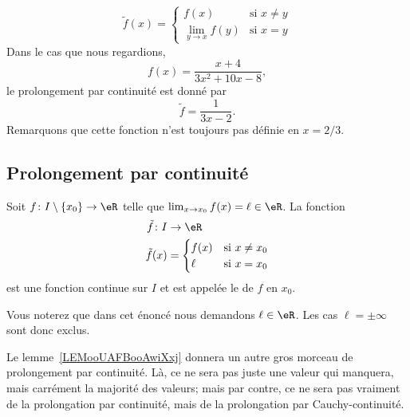 \begin{equation}
	\tilde f(x)=
	\begin{cases}
		f(x)              & \text{si }x\neq y \\
		\lim_{y\to x}f(y) & \text{si } x=y
	\end{cases}
\end{equation}
Dans le cas que nous regardions,
\[
	f(x)=\frac{ x+4 }{ 3x^2+10x-8 },
\]
le prolongement par continuité est donné par
\begin{equation}
	\tilde f =\frac{ 1 }{ 3x-2 }.
\end{equation}
Remarquons que cette fonction n'est toujours pas définie en \( x=2/3\).

\subsection{Prolongement par continuité}

\begin{propositionDef}
	Soit \( f\colon I\setminus\{ x_0 \}\to \eR\) telle que \( \lim_{x\to x_{0}} f(x)=\ell\in \eR\). La fonction
	\begin{equation}
		\begin{aligned}
			\tilde f\colon I & \to \eR                      \\
			\tilde f(x)      & =\begin{cases}
				                    f(x) & \text{si } x\neq x_0 \\
				                    \ell & \text{si } x=x_0
			                    \end{cases}
		\end{aligned}
	\end{equation}
	est une fonction continue sur \( I\) et est appelée le  de \( f\) en \( x_0\).
\end{propositionDef}
Vous noterez que dans cet énoncé nous demandons \( \ell\in \eR\). Les cas \( \ell=\pm\infty\) sont donc exclus.

\begin{normaltext}
	Le lemme~\ref{LEMooUAFBooAwiXxj} donnera un autre gros morceau de prolongement par continuité. Là, ce ne sera pas juste une valeur qui manquera, mais carrément la majorité des valeurs; mais par contre, ce ne sera pas vraiment de la prolongation par continuité, mais de la prolongation par Cauchy-continuité.
\end{normaltext}

